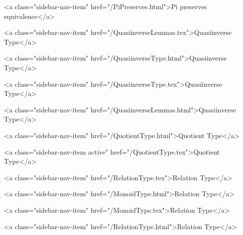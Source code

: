           <a class="sidebar-nav-item" href="/PiPreserves.html">Pi preserves equivalence</a>
        
      
    
      
        
          <a class="sidebar-nav-item" href="/QuasiinverseLemmas.tex">Quasiinverse Type</a>
        
      
    
      
        
          <a class="sidebar-nav-item" href="/QuasiinverseType.html">Quasiinverse Type</a>
        
      
    
      
        
          <a class="sidebar-nav-item" href="/QuasiinverseType.tex">Quasiinverse Type</a>
        
      
    
      
        
          <a class="sidebar-nav-item" href="/QuasiinverseLemmas.html">Quasiinverse Type</a>
        
      
    
      
        
          <a class="sidebar-nav-item" href="/QuotientType.html">Quotient Type</a>
        
      
    
      
        
          <a class="sidebar-nav-item active" href="/QuotientType.tex">Quotient Type</a>
        
      
    
      
        
          <a class="sidebar-nav-item" href="/RelationType.tex">Relation Type</a>
        
      
    
      
        
          <a class="sidebar-nav-item" href="/MonoidType.html">Relation Type</a>
        
      
    
      
        
          <a class="sidebar-nav-item" href="/MonoidType.tex">Relation Type</a>
        
      
    
      
        
          <a class="sidebar-nav-item" href="/RelationType.html">Relation Type</a>
        
      
    
